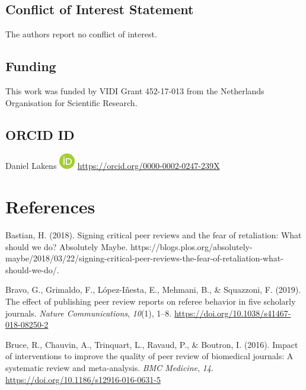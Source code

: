 \documentclass[
  english,
  ,jou, a4paper,floatsintext]{apa6}
\begin{document}
\hypertarget{conflict-of-interest-statement}{%
\subsection{Conflict of Interest Statement}\label{conflict-of-interest-statement}}

The authors report no conflict of interest.

\hypertarget{funding}{%
\subsection{Funding}\label{funding}}

This work was funded by VIDI Grant 452-17-013 from the Netherlands Organisation for Scientific Research.

\hypertarget{orcid-id}{%
\subsection{ORCID ID}\label{orcid-id}}

Daniel Lakens \includegraphics{orcid.png} \url{https://orcid.org/0000-0002-0247-239X}

\hypertarget{references}{%
\section{References}\label{references}}

\setlength{\parindent}{-0.5in}
\setlength{\leftskip}{0.5in}

\hypertarget{refs}{}
\leavevmode\hypertarget{ref-bastian_signing_2018}{}%
Bastian, H. (2018). Signing critical peer reviews and the fear of retaliation: What should we do? \textbar{} Absolutely Maybe. https://blogs.plos.org/absolutely-maybe/2018/03/22/signing-critical-peer-reviews-the-fear-of-retaliation-what-should-we-do/.

\leavevmode\hypertarget{ref-bravo_effect_2019}{}%
Bravo, G., Grimaldo, F., López-Iñesta, E., Mehmani, B., \& Squazzoni, F. (2019). The effect of publishing peer review reports on referee behavior in five scholarly journals. \emph{Nature Communications}, \emph{10}(1), 1--8. \url{https://doi.org/10.1038/s41467-018-08250-2}

\leavevmode\hypertarget{ref-bruce_impact_2016}{}%
Bruce, R., Chauvin, A., Trinquart, L., Ravaud, P., \& Boutron, I. (2016). Impact of interventions to improve the quality of peer review of biomedical journals: A systematic review and meta-analysis. \emph{BMC Medicine}, \emph{14}. \url{https://doi.org/10.1186/s12916-016-0631-5}
\end{document}
